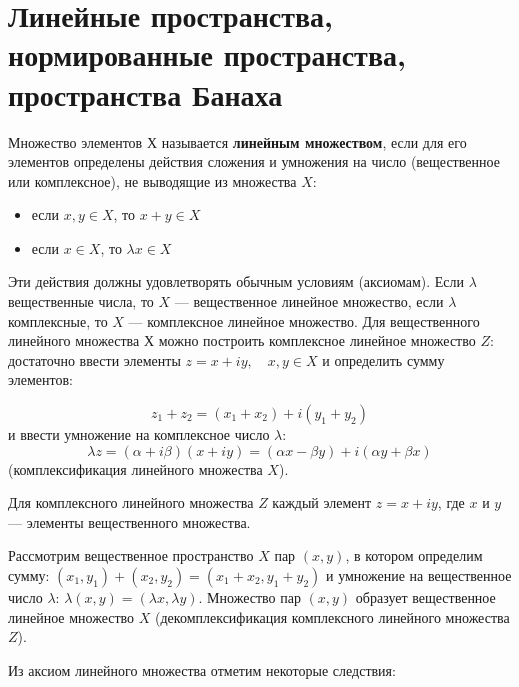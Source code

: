 \documentclass[12pt,a4paper,titlepage, oneside]{book}
\theoremstyle{definition}
\theoremstyle{plain}
\theoremstyle{remark}
\theoremstyle{remark}
\theoremstyle{remark}
\theoremstyle{plain}
\theoremstyle{plain}
\begin{document}
\section{Линейные пространства, нормированные пространства, пространства Банаха}

Множество элементов $Х$ называется \textbf{линейным множеством}, если для его элементов определены действия сложения и умножения на число (вещественное или комплексное), не выводящие из множества $X$:

\begin{itemize}

	\item если $x,y\in X$, то $x+y\in X$

	\item если $x\in X$, то $\lambda x\in X$

\end{itemize}


Эти действия должны удовлетворять обычным условиям (аксиомам). Если $\lambda$ вещественные числа, то $X$ --- вещественное линейное множество, если $\lambda$ комплексные, то $X$ --- комплексное линейное множество. Для вещественного линейного множества $Х$ можно построить комплексное линейное множество $Z$: достаточно ввести элементы $z=x+iy,\quad x,y \in X$ и определить сумму элементов:

\begin{equation*}
z_1+z_2=(x_1+x_2)+i(y_1+y_2)
\end{equation*}
и ввести умножение на комплексное число $\lambda$:
\begin{equation*}
\lambda z = (\alpha + i\beta)(x+iy) = (\alpha x - \beta y)+i(\alpha y + \beta x)
\end{equation*}
(комплексификация линейного множества $X$).

Для комплексного линейного множества $Z$ каждый элемент $z=x+iy$, где $x$ и $y$ --- элементы вещественного множества.

Рассмотрим вещественное пространство $X$ пар $(x,y)$, в котором определим сумму: $(x_1,y_1)+(x_2,y_2) = (x_1+x_2,y_1+y_2)$ и умножение на вещественное число $\lambda$: $\lambda(x,y) = (\lambda x, \lambda y)$. Множество пар $(x,y)$ образует вещественное линейное множество  $X$ (декомплексификация комплексного линейного множества $Z$).

Из аксиом линейного множества отметим некоторые следствия:
\end{document}
